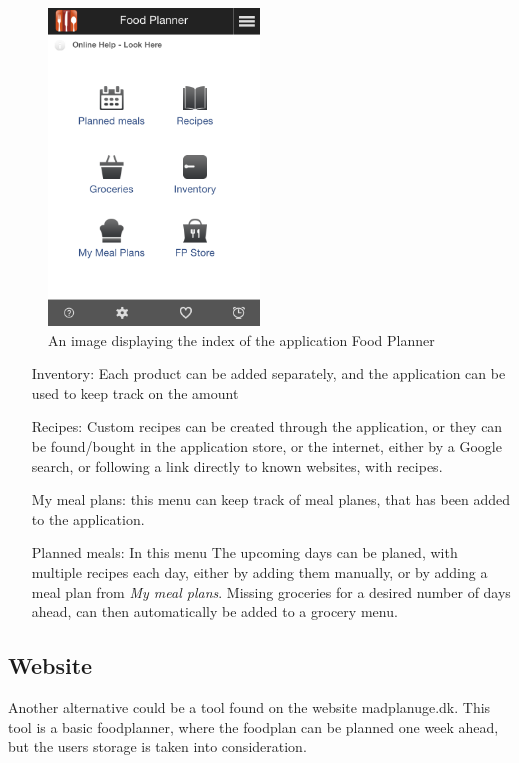 \begin{figure}[H]
    \centering
    \includegraphics[width=0.5\textwidth]{Grafik/FoodPlanner/index}
    \caption{An image displaying the index of the application Food Planner}
    \label{FoodPlannerIndex}
\end{figure}
\begin{itemize}
  \item[Inventory:] Each product can be added separately, and the application can be used to keep track on the amount
  \item[Recipes:] Custom recipes can be created through the application, or they can be found/bought in the application store, or the internet, either by a Google search, or following a link directly to known websites, with recipes.
  \item[My meal plans:] this menu can keep track of meal planes, that has been added to the application.
  \item[Planned meals:] In this menu The upcoming days can be planed, with multiple recipes each day, either by adding them manually, or by adding a meal plan from \textit{My meal plans}. Missing groceries for a desired  number of days ahead, can then automatically be added to a grocery menu.
\end{itemize}

\subsection{Website}
Another alternative could be a tool found on the website madplanuge.dk\cite{madSpild_madPlanUge}. This tool is a basic foodplanner, where the foodplan can be planned one week ahead, but the users storage is taken into consideration.

